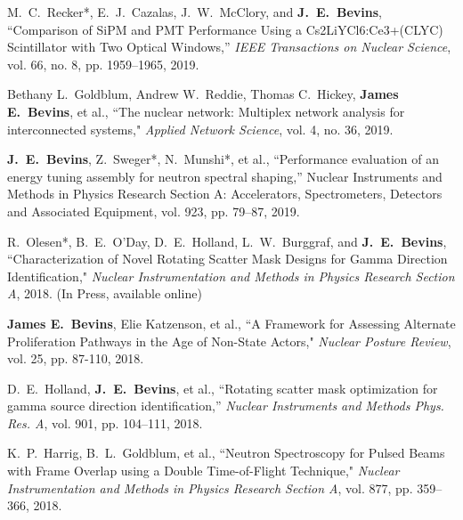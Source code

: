 \begin{bibsection}
  
  \item M.\ C.\ Recker*, E.\ J.\ Cazalas, J.\ W.\ McClory, and \textbf{J.\ E.\ Bevins}, ``Comparison of SiPM and PMT Performance Using a Cs2LiYCl6:Ce3+(CLYC) Scintillator with Two Optical Windows,” \textit{IEEE Transactions on Nuclear Science}, vol. 66, no. 8, pp. 1959–1965, 2019.

  \item Bethany L.\ Goldblum, Andrew W.\ Reddie, Thomas C.\ Hickey, \textbf{James E.\ Bevins}, et al., ``The nuclear network: Multiplex network analysis for interconnected systems," \textit{Applied Network Science}, vol. 4, no. 36, 2019.
  
   \item \textbf{J.\ E.\ Bevins}, Z.\ Sweger*, N.\ Munshi*, et al., ``Performance evaluation of an energy tuning assembly for neutron spectral shaping,” Nuclear Instruments and Methods in Physics Research Section A: Accelerators, Spectrometers, Detectors and Associated Equipment, vol. 923, pp. 79–87, 2019.

   \item R.\ Olesen*, B.\ E.\ O’Day, D.\ E.\ Holland, L.\ W.\ Burggraf, and \textbf{J.\ E.\ Bevins}, ``Characterization of Novel Rotating Scatter Mask Designs for Gamma Direction Identification," \textit{Nuclear Instrumentation and Methods in Physics Research Section A}, 2018. (In Press, available online)
      
  \item \textbf{James E.\ Bevins}, Elie Katzenson, et al., ``A Framework for Assessing Alternate Proliferation Pathways in the Age of Non-State Actors,"  \textit{Nuclear Posture Review}, vol. 25, pp. 87-110, 2018. 
  
  
  \item D.\ E.\ Holland, \textbf{J.\ E.\ Bevins}, et al., ``Rotating scatter mask optimization for gamma source direction identification,” \textit{Nuclear Instruments and Methods Phys. Res. A}, vol. 901, pp. 104–111, 2018.
  
  \item K.\ P.\ Harrig, B.\ L.\ Goldblum, et al., ``Neutron Spectroscopy for Pulsed Beams with Frame Overlap using a Double Time-of-Flight Technique," \textit{Nuclear Instrumentation and Methods in Physics Research Section A}, vol. 877, pp. 359–366, 2018.


\end{bibsection}
